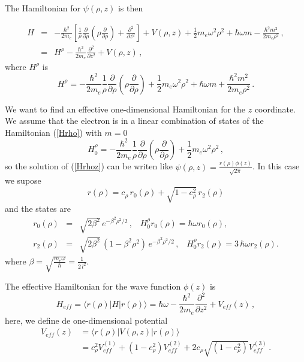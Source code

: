 \documentclass[a4paper,10pt]{article}
\begin{document}
The Hamiltonian for $\psi(\rho,z)$ is then

\begin{eqnarray}\label{Hrhoz}
H &=& -\frac{\hbar^2}{2 m_e}\left[\frac{1}{\rho}\frac{\partial}{\partial \rho}\left(\rho \frac{\partial}{\partial \rho} \right)
 + \frac{\partial^2}{\partial z^2} \right] + V(\rho, z) + \frac{1}{2} m_e \omega^2 \rho^2 + \hbar \omega m - \frac{\hbar^2 m^2}{2 m_e \rho^2}\,,\\
  &=& H^{\rho} - \frac{\hbar^2}{2 m_e}\frac{\partial^2}{\partial z^2} + V(\rho, z)\, ,
\end{eqnarray}
\noindent
where $H^{\rho}$ is
\begin{equation}\label{Hrho}
  H^{\rho} = -\frac{\hbar^2}{2 m_e} \frac{1}{\rho}\frac{\partial}{\partial \rho}\left(\rho \frac{\partial}{\partial \rho} \right) +
  \frac{1}{2} m_e \omega^2 \rho^2 + \hbar \omega m + \frac{\hbar^2 m^2}{2 m_e \rho^2}\,.
\end{equation}

We want to find an effective one-dimensional Hamiltonian for the $z$ coordinate. We assume that
the electron is in a linear combination of states of the Hamiltonian (\ref{Hrho}) with $m = 0$
\begin{equation}
  H_{0}^{\rho} = -\frac{\hbar^2}{2 m_e} \frac{1}{\rho}\frac{\partial}{\partial \rho}\left(\rho \frac{\partial}{\partial \rho} \right) +
  \frac{1}{2} m_e \omega^2 \rho^2 \, ,
\end{equation}
\noindent so the solution of (\ref{Hrhoz})
can be writen like $\psi(\rho, z) = \frac{r(\rho)\phi(z)}{\sqrt{2\pi}}$. In this case we supose
\begin{equation}
  r(\rho) = c_{\rho}\, r_0(\rho) + \sqrt{1 - c_{\rho}^2}\, r_2(\rho)
\end{equation}
\noindent and the states are
\begin{eqnarray}
  r_0(\rho) &=& \sqrt{2 \beta^2}\, e^{-\beta^2 \rho^2/2}\,,\,\,\,\,\,H_{0}^{\rho} r_0(\rho) = \hbar \omega r_0(\rho) ,\\
  r_2(\rho) &=& \sqrt{2 \beta^2}\, \left(1 - \beta^2 \rho^2 \right)\, e^{-\beta^2 \rho^2/2}\,,\,\,\,\,\,H_{0}^{\rho} r_2(\rho) = 3\,\hbar \omega r_2(\rho).
\end{eqnarray}
\noindent where $\beta = \sqrt{\frac{m_e \omega}{\hbar}} = \frac{1}{2\,l^2}$.

The effective Hamiltonian for the wave function $\phi(z)$ is
\begin{equation}
  H_{eff} = \langle r(\rho)|H|r(\rho)\rangle = \hbar \omega - \frac{\hbar^2}{2 m_e}\frac{\partial^2}{\partial z^2} + V_{eff}(z)\,,
\end{equation}
\noindent here, we define de one-dimensional potential
\begin{equation}\label{1e_V_eff}
  \begin{split}
  V_{eff}(z) &= \langle r(\rho)|V(\rho,z)|r(\rho)\rangle \\
             &= c_{\rho}^2 V_{eff}^{(1)} + (1-c_{\rho}^2) V_{eff}^{(2)} + 2c_{\rho}\sqrt{(1-c_{\rho}^2)} V_{eff}^{(3)}\,.
  \end{split}
\end{equation}
\end{document}
